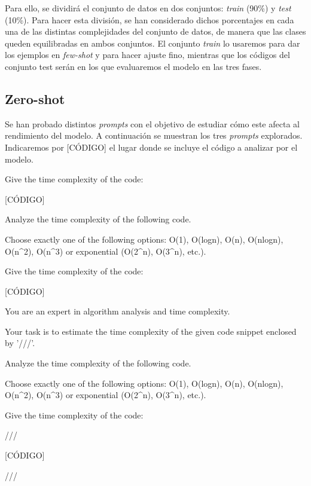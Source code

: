 \documentclass[12pt,twoside]{article}
\begin{document}
Para ello, se dividirá el conjunto de datos en dos conjuntos: \textit{train} (90\%) y \textit{test} (10\%). Para hacer esta división, se han considerado dichos porcentajes en cada una de las distintas complejidades del conjunto de datos, de manera que las clases queden equilibradas en ambos conjuntos. El conjunto \textit{train} lo usaremos para dar los ejemplos en \textit{few-shot} y para hacer ajuste fino, mientras que los códigos del conjunto test serán en los que evaluaremos el modelo en las tres fases.

\subsection{Zero-shot}

Se han probado distintos \textit{prompts} con el objetivo de estudiar cómo este afecta al rendimiento del modelo. A continuación se muestran los tres \textit{prompts} explorados. Indicaremos por [CÓDIGO] el lugar donde se incluye el código a analizar por el modelo.

\begin{tcolorbox}[
  colback=gray!5,
  colframe=black,
  boxrule=0.5pt,
  breakable,
  title=Prompt 1 zero-shot,
]
Give the time complexity of the code:

[CÓDIGO]
\end{tcolorbox}

\begin{tcolorbox}[
  colback=gray!5,
  colframe=black,
  boxrule=0.5pt,
  breakable,
  title=Prompt 2 zero-shot,
]
Analyze the time complexity of the following code.

Choose exactly one of the following options: O(1), O(logn), O(n), O(nlogn), O(n\textasciicircum2), O(n\textasciicircum3) or exponential (O(2\textasciicircum n), O(3\textasciicircum n), etc.).

Give the time complexity of the code:

[CÓDIGO]
\end{tcolorbox}

\begin{tcolorbox}[
  colback=gray!5,
  colframe=black,
  boxrule=0.5pt,
  breakable,
  title=Prompt 3 zero-shot,
]
You are an expert in algorithm analysis and time complexity.

Your task is to estimate the time complexity of the given code snippet enclosed by '///'.

Analyze the time complexity of the following code.

Choose exactly one of the following options: O(1), O(logn), O(n), O(nlogn), O(n\textasciicircum2), O(n\textasciicircum3) or exponential (O(2\textasciicircum n), O(3\textasciicircum n), etc.).

Give the time complexity of the code:

///

[CÓDIGO]

///
\end{tcolorbox}
\end{document}
